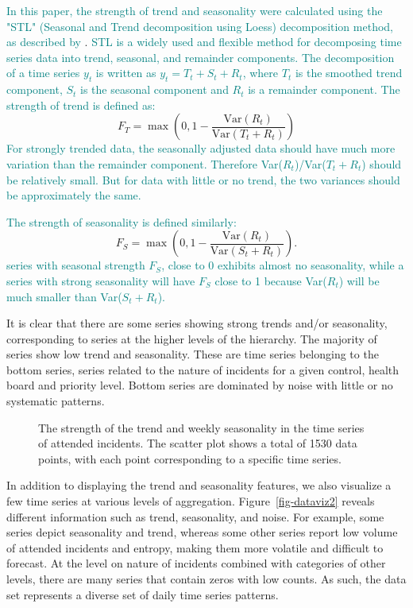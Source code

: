 \documentclass[
  authoryear,
  preprint,
  3p]{elsarticle}
\begin{document}
\textcolor{teal}{In this paper, the strength of trend and seasonality were calculated using the "STL" (Seasonal and Trend decomposition using Loess) decomposition method, as described by}
\citet{mstl}.
\textcolor{teal}{STL is a widely used and flexible method for decomposing time series data into trend, seasonal, and remainder components. The decomposition of a time series  $y_t$ is written as $y_t = T_t + S_{t} + R_t$, where $T_t$ is the smoothed trend component, $S_t$ is the seasonal component and $R_t$ is a remainder component. The strength of trend is defined as:}
\[F_T = \max\left(0, 1 - \frac{\text{Var}(R_t)}{\text{Var}(T_t+R_t)}\right)\]
\textcolor{teal}{For strongly trended data, the seasonally adjusted data should have much more variation than the remainder component. Therefore Var($R_t$)/Var($T_t+R_t$) should be relatively small. But for data with little or no trend, the two variances should be approximately the same.}

\textcolor{teal}{The strength of seasonality is defined similarly:}
\[F_S = \max\left(0, 1 - \frac{\text{Var}(R_t)}{\text{Var}(S_{t}+R_t)}\right).\]
\textcolor{teal}{series with seasonal strength  $F_S$, close to 0 exhibits almost no seasonality, while a series with strong seasonality will have $F_S$ close to 1 because Var($R_t$) will be much smaller than Var($S_t+R_t$).}

It is clear that there are some series showing strong trends and/or
seasonality, corresponding to series at the higher levels of the
hierarchy. The majority of series show low trend and seasonality. These
are time series belonging to the bottom series, series related to the
nature of incidents for a given control, health board and priority
level. Bottom series are dominated by noise with little or no systematic
patterns.

\begin{figure}


\caption{\label{fig-feature}The strength of the trend and weekly
seasonality in the time series of attended incidents. The scatter plot
shows a total of 1530 data points, with each point corresponding to a
specific time series.}

\end{figure}%

In addition to displaying the trend and seasonality features, we also
visualize a few time series at various levels of aggregation.
Figure~\ref{fig-dataviz2} reveals different information such as trend,
seasonality, and noise. For example, some series depict seasonality and
trend, whereas some other series report low volume of attended incidents
and entropy, making them more volatile and difficult to forecast. At the
level on nature of incidents combined with categories of other levels,
there are many series that contain zeros with low counts. As such, the
data set represents a diverse set of daily time series patterns.
\end{document}
